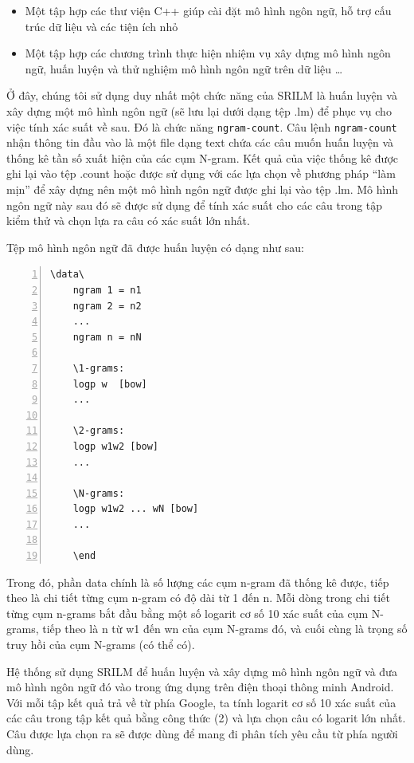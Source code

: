 \documentclass[12pt]{report}
\begin{document}
\begin{itemize}
	\item Một tập hợp các thư viện C++ giúp cài đặt mô hình ngôn ngữ, hỗ trợ cấu trúc dữ liệu và các tiện ích nhỏ
	\item Một tập hợp các chương trình thực hiện nhiệm vụ xây dựng mô hình ngôn ngữ, huấn luyện và thử nghiệm mô hình ngôn ngữ trên dữ liệu …
\end{itemize}

Ở đây, chúng tôi sử dụng duy nhất một chức năng của SRILM là huấn luyện và xây dựng một mô hình ngôn ngữ (sẽ lưu lại dưới dạng tệp .lm) để phục vụ cho việc tính xác suất về sau. Đó là chức năng \texttt{ngram-count}. Câu lệnh \texttt{ngram-count} nhận thông tin đầu vào là một file dạng text chứa các câu muốn huấn luyện và thống kê tần số xuất hiện của các cụm N-gram. Kết quả của việc thống kê được ghi lại vào tệp .count hoặc được sử dụng với các lựa chọn về phương pháp “làm mịn” để xây dựng nên một mô hình ngôn ngữ được ghi lại vào tệp .lm. Mô hình ngôn ngữ này sau đó sẽ được sử dụng để tính xác suất cho các câu trong tập kiểm thử và chọn lựa ra câu có xác suất lớn nhất.

Tệp mô hình ngôn ngữ đã được huấn luyện có dạng như sau:
\begin{lstlisting}[frame=lines, basicstyle=\footnotesize\ttfamily, numbers=left, numberstyle=\tiny\color{black},caption= {Cấu trúc một mô hình ngôn ngữ}, backgroundcolor=\color{background}]
	\data\
	ngram 1 = n1
	ngram 2 = n2
	...
	ngram n = nN

	\1-grams:
	logp w  [bow]
	...

	\2-grams:
	logp w1w2 [bow]
	...

	\N-grams:
	logp w1w2 ... wN [bow]
	...

	\end
\end{lstlisting}
		
Trong đó, phần data chính là số lượng các cụm n-gram đã thống kê được, tiếp theo là chi tiết từng cụm n-gram có độ dài từ 1 đến n. Mỗi dòng trong chi tiết từng cụm n-grams bắt đầu bằng một số logarit cơ số 10 xác suất của cụm N-grams, tiếp theo là n từ w1 đến wn của cụm N-grams đó, và cuối cùng là trọng số truy hồi của cụm N-grams (có thể có).

Hệ thống sử dụng SRILM để huấn luyện và xây dựng mô hình ngôn ngữ và đưa mô hình ngôn ngữ đó vào trong ứng dụng trên điện thoại thông minh Android. Với mỗi tập kết quả trả về từ phía Google, ta tính logarit cơ số 10 xác suất của các câu trong tập kết quả bằng công thức (2) và lựa chọn câu có logarit lớn nhất. Câu được lựa chọn ra sẽ được dùng để mang đi phân tích yêu cầu từ phía người dùng.
\end{document}
